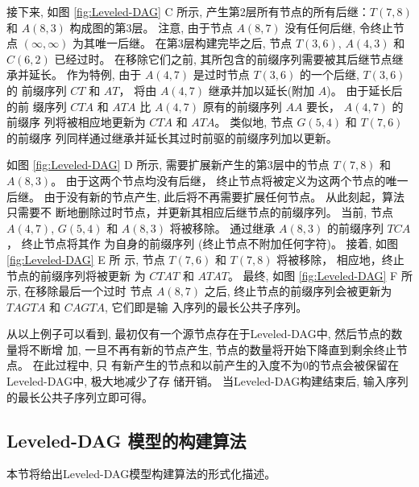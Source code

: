 接下来, 如图 \ref{fig:Leveled-DAG} C 所示, 产生第2层所有节点的所有后继：$T(7,
8)$ 和 $A(8, 3)$ 构成图的第3层。 注意, 由于节点 $A(8, 7)$ 没有任何后继, 令终止节
点 $(\infty, \infty)$ 为其唯一后继。 在第3层构建完毕之后, 节点 $T(3, 6)$, $A(4,
3)$ 和 $C(6, 2)$ 已经过时。 在移除它们之前, 其所包含的前缀序列需要被其后继节点继
承并延长。 作为特例, 由于 $A(4, 7)$ 是过时节点 $T(3, 6)$ 的一个后继, $T(3, 6)$ 的
前缀序列 $CT$ 和 $AT$， 将由 $A(4, 7)$ 继承并加以延长(附加 $A$)。 由于延长后的前
缀序列 $CTA$ 和 $ATA$ 比 $A(4, 7)$ 原有的前缀序列 $AA$ 要长， $A(4, 7)$ 的前缀序
列将被相应地更新为 $CTA$ 和 $ATA$。 类似地, 节点 $G(5, 4)$ 和 $T(7, 6)$ 的前缀序
列同样通过继承并延长其过时前驱的前缀序列加以更新。

如图 \ref{fig:Leveled-DAG} D 所示, 需要扩展新产生的第3层中的节点 $T(7,
8)$ 和 $A(8, 3)$。 由于这两个节点均没有后继， 终止节点将被定义为这两个节点的唯一
后继。 由于没有新的节点产生, 此后将不再需要扩展任何节点。 从此刻起，算法只需要不
断地删除过时节点，并更新其相应后继节点的前缀序列。 当前, 节点 $A(4, 7)$, $G(5,
4)$ 和 $A(8, 3)$ 将被移除。 通过继承 $A(8, 3)$ 的前缀序列 $TCA$， 终止节点将其作
为自身的前缀序列 (终止节点不附加任何字符)。 接着, 如图 \ref{fig:Leveled-DAG} E 所
示, 节点 $T(7, 6)$ 和 $T(7, 8)$ 将被移除， 相应地，终止节点的前缀序列将被更新
为 $CTAT$ 和 $ATAT$。 最终, 如图 \ref{fig:Leveled-DAG} F 所示, 在移除最后一个过时
节点 $A(8, 7)$ 之后, 终止节点的前缀序列会被更新为 $TAGTA$ 和 $CAGTA$, 它们即是输
入序列的最长公共子序列。

从以上例子可以看到, 最初仅有一个源节点存在于Leveled-DAG中, 然后节点的数量将不断增
加, 一旦不再有新的节点产生, 节点的数量将开始下降直到剩余终止节点。 在此过程中, 只
有新产生的节点和以前产生的入度不为0的节点会被保留在Leveled-DAG中, 极大地减少了存
储开销。 当Leveled-DAG构建结束后, 输入序列的最长公共子序列立即可得。

\subsection{Leveled-DAG 模型的构建算法 }
\label{sec:PMA}

本节将给出Leveled-DAG模型构建算法的形式化描述。

